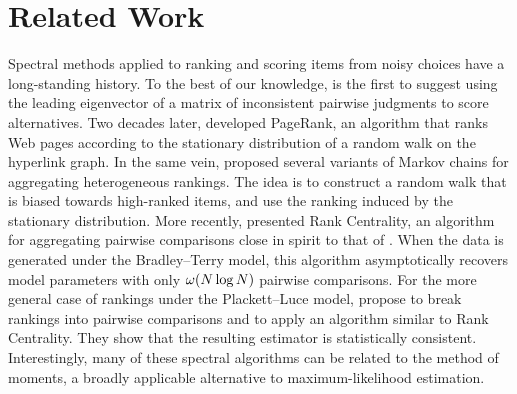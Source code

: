 \section{Related Work}
\label{fi:sec:relwork}

Spectral methods applied to ranking and scoring items from noisy choices have a long-standing history.
To the best of our knowledge, \citet{saaty1980analytic} is the first to suggest using the leading eigenvector of a matrix of inconsistent pairwise judgments to score alternatives.
Two decades later, \citet{page1998pagerank} developed PageRank, an algorithm that ranks Web pages according to the stationary distribution of a random walk on the hyperlink graph.
In the same vein, \citet{dwork2001rank} proposed several variants of Markov chains for aggregating heterogeneous rankings.
The idea is to construct a random walk that is biased towards high-ranked items, and use the ranking induced by the stationary distribution.
More recently, \citet{negahban2012iterative} presented Rank Centrality, an algorithm for aggregating pairwise comparisons close in spirit to that of \citep{dwork2001rank}.
When the data is generated under the Bradley--Terry model, this algorithm asymptotically recovers model parameters with only $\omega(N \log N)$ pairwise comparisons.
For the more general case of rankings under the Plackett--Luce model, \citet{azari2013generalized} propose to break rankings into pairwise comparisons and to apply an algorithm similar to Rank Centrality.
They show that the resulting estimator is statistically consistent.
Interestingly, many of these spectral algorithms can be related to the method of moments, a broadly applicable alternative to maximum-likelihood estimation.



